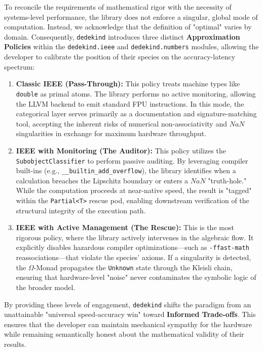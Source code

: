 \documentclass[11pt, a4paper]{report}
\begin{document}
To reconcile the requirements of mathematical rigor with the necessity of systems-level performance, the library does not enforce a singular, global mode of computation. Instead, we acknowledge that the definition of "optimal" varies by domain. Consequently, \texttt{dedekind} introduces three distinct \textbf{Approximation Policies} within the \texttt{dedekind.ieee} and \texttt{dedekind.numbers} modules, allowing the developer to calibrate the position of their species on the accuracy-latency spectrum:

\begin{enumerate}
  \item \textbf{Classic IEEE (Pass-Through):} This policy treats machine types like \texttt{double} as primal atoms. The library performs no active monitoring, allowing the LLVM backend to emit standard FPU instructions. In this mode, the categorical layer serves primarily as a documentation and signature-matching tool, accepting the inherent risks of numerical non-associativity and $NaN$ singularities in exchange for maximum hardware throughput.

  \item \textbf{IEEE with Monitoring (The Auditor):} This policy utilizes the \texttt{SubobjectClassifier} to perform passive auditing. By leveraging compiler built-ins (e.g., \texttt{\_\_builtin\_add\_overflow}), the library identifies when a calculation breaches the Lipschitz boundary or enters a $NaN$ "truth-hole." While the computation proceeds at near-native speed, the result is "tagged" within the \texttt{Partial<T>} rescue pod, enabling downstream verification of the structural integrity of the execution path.

  \item \textbf{IEEE with Active Management (The Rescue):} This is the most rigorous policy, where the library actively intervenes in the algebraic flow. It explicitly disables hazardous compiler optimizations---such as \texttt{-ffast-math} reassociations---that violate the species' axioms. If a singularity is detected, the $\Omega$-Monad propagates the \texttt{Unknown} state through the Kleisli chain, ensuring that hardware-level "noise" never contaminates the symbolic logic of the broader model.
\end{enumerate}

By providing these levels of engagement, \texttt{dedekind} shifts the paradigm from an unattainable "universal speed-accuracy win" toward \textbf{Informed Trade-offs}. This ensures that the developer can maintain mechanical sympathy for the hardware while remaining semantically honest about the mathematical validity of their results.
\end{document}
